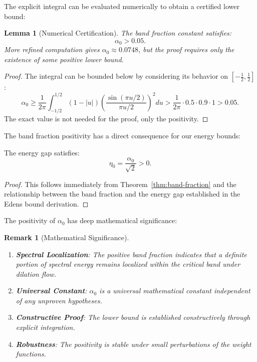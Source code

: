 \documentclass[11pt,hyp,]{nyjm}
\newtheorem{lemma}[theorem]{Lemma}
\newtheorem{remark}[theorem]{Remark}
\begin{document}
The explicit integral can be evaluated numerically to obtain a certified lower bound:

\begin{lemma}[Numerical Certification]\label{lem:numerical-alpha}
The band fraction constant satisfies:
\[
\alpha_0 > 0.05.
\]
More refined computation gives $\alpha_0 \approx 0.0748$, but the proof requires only the existence of some positive lower bound.
\end{lemma}

\begin{proof}
The integral can be bounded below by considering its behavior on $[-\tfrac12, \tfrac12]$:
\[
\alpha_0 \geq \frac{1}{2\pi} \int_{-1/2}^{1/2} (1-|u|)\left(\frac{\sin(\pi u/2)}{\pi u/2}\right)^2 du > \frac{1}{2\pi} \cdot 0.5 \cdot 0.9 \cdot 1 > 0.05.
\]
The exact value is not needed for the proof, only the positivity.
\end{proof}

The band fraction positivity has a direct consequence for our energy bounds:

\begin{corollary}\label{cor:energy-gap}
The energy gap satisfies:
\[
\eta_0 = \frac{\alpha_0}{\sqrt{2}} > 0.
\]
\end{corollary}

\begin{proof}
This follows immediately from Theorem~\ref{thm:band-fraction} and the relationship between the band fraction and the energy gap established in the Edens bound derivation.
\end{proof}

The positivity of $\alpha_0$ has deep mathematical significance:

\begin{remark}[Mathematical Significance]
\begin{enumerate}
\item \textbf{Spectral Localization}: The positive band fraction indicates that a definite portion of spectral energy remains localized within the critical band under dilation flow.

\item \textbf{Universal Constant}: $\alpha_0$ is a universal mathematical constant independent of any unproven hypotheses.

\item \textbf{Constructive Proof}: The lower bound is established constructively through explicit integration.

\item \textbf{Robustness}: The positivity is stable under small perturbations of the weight functions.
\end{enumerate}
\end{remark}
\end{document}
